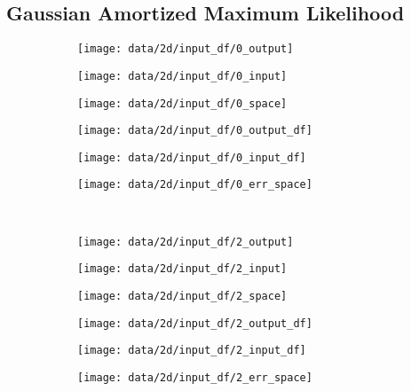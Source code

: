 \subsection{Gaussian Amortized Maximum Likelihood}
\label{sec:shape-inference-gaussian-aml}

\begin{figure}
  \centering
  \hspace*{-0.25cm}
  \begin{subfigure}[t]{0.12\textwidth}
    \texttt{[image: data/2d/input\_df/0\_output]}
  \end{subfigure}
  \begin{subfigure}[t]{0.12\textwidth}
    \texttt{[image: data/2d/input\_df/0\_input]}
  \end{subfigure}
  \begin{subfigure}[t]{0.12\textwidth}
    \texttt{[image: data/2d/input\_df/0\_space]}
  \end{subfigure}
  \begin{subfigure}[t]{0.12\textwidth}
    \texttt{[image: data/2d/input\_df/0\_output\_df]}
  \end{subfigure}
  \begin{subfigure}[t]{0.12\textwidth}
    \texttt{[image: data/2d/input\_df/0\_input\_df]}
  \end{subfigure}
  \begin{subfigure}[t]{0.12\textwidth}
    \texttt{[image: data/2d/input\_df/0\_err\_space]}
  \end{subfigure}\\

  \begin{subfigure}[t]{0.12\textwidth}
    \texttt{[image: data/2d/input\_df/2\_output]}
  \end{subfigure}
  \begin{subfigure}[t]{0.12\textwidth}
    \texttt{[image: data/2d/input\_df/2\_input]}
  \end{subfigure}
  \begin{subfigure}[t]{0.12\textwidth}
    \texttt{[image: data/2d/input\_df/2\_space]}
  \end{subfigure}
  \begin{subfigure}[t]{0.12\textwidth}
    \texttt{[image: data/2d/input\_df/2\_output\_df]}
  \end{subfigure}
  \begin{subfigure}[t]{0.12\textwidth}
    \texttt{[image: data/2d/input\_df/2\_input\_df]}
  \end{subfigure}
  \begin{subfigure}[t]{0.12\textwidth}
    \texttt{[image: data/2d/input\_df/2\_err\_space]}
  \end{subfigure}


\end{figure}
